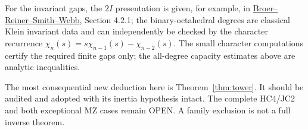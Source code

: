 \documentclass[11pt]{article}
\begin{document}
For the invariant gaps, the $2I$ presentation is given, for example, in
\href{https://www-users.cse.umn.edu/~webb/Publications/BRSW6.pdf}{Broer--Reiner--Smith--Webb},
Section 4.2.1; the binary-octahedral degrees are classical Klein invariant
data and can independently be checked by the character recurrence
$\chi_n(s)=s\chi_{n-1}(s)-\chi_{n-2}(s)$.
The small character computations certify the required finite gaps only;
the all-degree capacity estimates above are analytic inequalities.

The most consequential new deduction here is
Theorem~\ref{thm:tower}. It should be audited and adopted with its inertia
hypothesis intact. The complete HC4/JC2 and both exceptional MZ cases
remain OPEN. A family exclusion is not a full inverse theorem.
\end{document}
